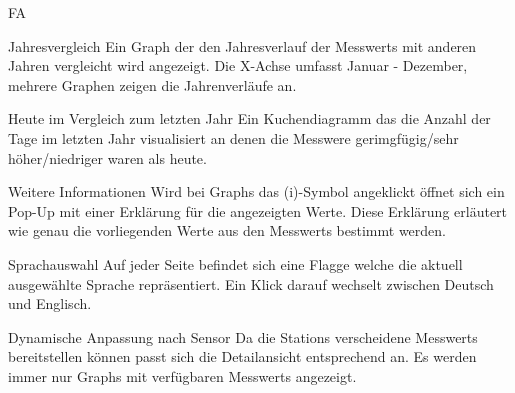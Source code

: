 \begin{Kriterien}{FA}
 \item[Jahresvergleich]
   Ein Graph der den Jahresverlauf der \glspl{Messwert} mit anderen Jahren vergleicht wird angezeigt.
   Die X-Achse umfasst Januar - Dezember, mehrere Graphen zeigen die Jahrenverläufe an.

 \item[Heute im Vergleich zum letzten Jahr]
   Ein \gls{Kuchendiagramm} das die Anzahl der Tage im letzten Jahr visualisiert an denen die Messwere gerimgfügig/sehr höher/niedriger waren als heute.

 \item[Weitere Informationen]
   Wird bei \glspl{Graph} das (i)-Symbol angeklickt öffnet sich ein \gls{Pop-Up} mit einer Erklärung für die angezeigten Werte.
   Diese Erklärung erläutert wie genau die vorliegenden Werte aus den \glspl{Messwert} bestimmt werden.

 \item[Sprachauswahl]
   Auf jeder Seite befindet sich eine Flagge welche die aktuell ausgewählte Sprache repräsentiert.
   Ein Klick darauf wechselt zwischen Deutsch und Englisch.

 \item[Dynamische Anpassung nach Sensor]
   Da die \glspl{Station} verscheidene \glspl{Messwert} bereitstellen können passt sich die Detailansicht entsprechend an.
   Es werden immer nur \glspl{Graph} mit verfügbaren \glspl{Messwert} angezeigt.
\end{Kriterien}